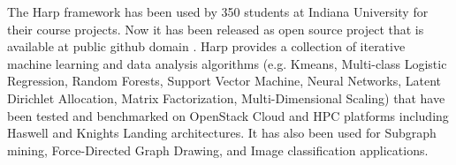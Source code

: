 The Harp framework has been used by 350 students at Indiana University
for their course projects. Now it has been released as open source
project that is available at public github domain
\cite{Web:harp}. Harp provides a collection of iterative machine
learning and data analysis algorithms (e.g. Kmeans, Multi-class
Logistic Regression, Random Forests, Support Vector Machine, Neural
Networks, Latent Dirichlet Allocation, Matrix Factorization,
Multi-Dimensional Scaling) that have been tested and benchmarked on
OpenStack Cloud and HPC platforms including Haswell and Knights
Landing architectures. It has also been used for Subgraph mining,
Force-Directed Graph Drawing, and Image classification applications.

